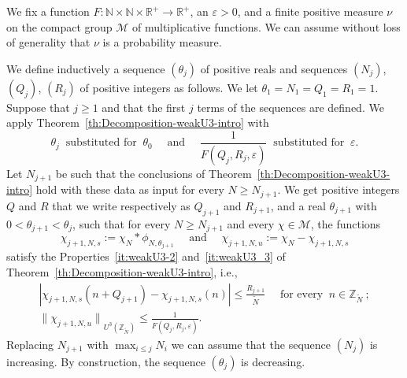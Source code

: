 \documentclass[11pt]{amsart}
\theoremstyle{definition}
\begin{document}
We fix a function $F\colon {{\mathbb N}} \times {{\mathbb N}} \times {{\mathbb R}}^+\to {{\mathbb R}}^+$, an
  ${\varepsilon}>0$, and a finite positive measure $\nu$ on the compact group
${{\mathcal M}}$ of multiplicative functions. We can assume without loss of
generality that $\nu$ is a probability measure.

We define inductively  a sequence  $(\theta_j)$ of positive reals
and sequences $(N_j)$,  $(Q_j)$, $(R_j)$ of positive integers as
follows.
 We let $\theta_1=N_1=Q_1=R_1=1$. Suppose
 that $j\geq 1$ and that the first $j$ terms of the sequences are defined.
 We apply
Theorem~\ref{th:Decomposition-weakU3-intro} with
$$
\theta_{j} \ \text{ substituted for } \ \theta_0\quad \text{ and } \quad  \frac
1{F(Q_j,R_{j},{\varepsilon})} \ \text{ substituted for } \ {\varepsilon}.
$$
Let $N_{j+1}$ be such that the conclusions of
Theorem~\ref{th:Decomposition-weakU3-intro} hold with these data as
input for every $N\geq N_{j+1}$. We get  positive integers $Q$ and
$R$ that we write respectively as  $Q_{j+1}$ and $R_{j+1}$, and a
real $\theta_{j+1}$ with $0<\theta_{j+1}<\theta_{j}$, such that for
every $N\geq N_{j+1}$ and every $\chi\in{{\mathcal M}}$, the functions
$$
\chi_{j+1,N,s}:=\chi_N*\phi_{N,\theta_{j+1}}\quad \text{ and } \quad
\chi_{j+1,N,u}:=\chi_N-\chi_{j+1,N,s}
$$
 satisfy the Properties~\eqref{it:weakU3-2} and~\eqref{it:weakU3_3}
 of Theorem~\ref{th:Decomposition-weakU3-intro}, i.e.,
\begin{gather}
\label{eq:decompU32}
 |\chi_{j+1,N,s}(n+Q_{j+1})-\chi_{j+1,N,s}(n)|\leq \frac {R_{j+1}} {{\widetilde N}}\quad \text{ for every }\ n\in
{{\mathbb Z}}_{{\widetilde N}}\ ;\\
\label{eq:decompU33} {\lVert {\chi_{j+1,N,u}} \rVert}_{U^3({{{\mathbb Z}}_{\widetilde N}})}\leq \frac
1{F(Q_j,R_{j},{\varepsilon})}.
\end{gather}
Replacing $N_{j+1}$ with $\max_{i\leq j}N_i$ we can assume that the
sequence $(N_j)$ is increasing. By construction, the sequence
$(\theta_j)$ is decreasing.
\end{document}
